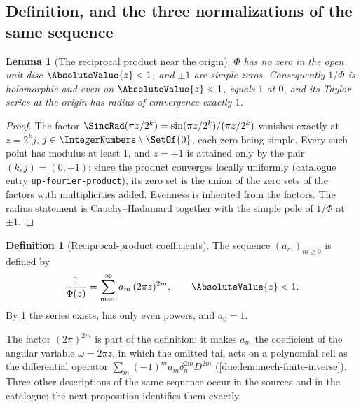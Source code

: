 \documentclass[11pt,oneside]{article}
\theoremstyle{plain}
\newtheorem{lemma}[theorem]{Lemma}
\theoremstyle{definition}
\newtheorem{definition}[theorem]{Definition}
\theoremstyle{remark}
\newcommand{\PhiUp}{\Phi}                                   %
\newcommand{\am}[1]{a_{#1}}                                 %
\begin{document}
\subsection{Definition, and the three normalizations of the same sequence}

\begin{lemma}[The reciprocal product near the origin]
\label{due:lem:mech-zero-free}
\(\PhiUp\) has no zero in the open unit disc \(\AbsoluteValue{z}<1\), and
\(\pm1\) are simple zeros.  Consequently \(1/\PhiUp\) is holomorphic and even
on \(\AbsoluteValue{z}<1\), equals \(1\) at \(0\), and its Taylor series at
the origin has radius of convergence exactly \(1\).
\end{lemma}

\begin{proof}
The factor \(\SincRad(\pi z/2^{k})=\sin(\pi z/2^{k})/(\pi z/2^{k})\) vanishes
exactly at \(z=2^{k}j\), \(j\in\IntegerNumbers\setminus\SetOf{0}\), each zero
being simple.  Every such point has modulus at least \(1\), and \(z=\pm1\) is
attained only by the pair \((k,j)=(0,\pm1)\); since the product converges
locally uniformly (catalogue entry \texttt{up-fourier-product}), its zero set
is the union of the zero sets of the factors with multiplicities added.
Evenness is inherited from the factors.  The radius statement is
Cauchy--Hadamard together with the simple pole of \(1/\PhiUp\) at \(\pm1\).
\end{proof}

\begin{definition}[Reciprocal-product coefficients]
\label{due:def:mech-am}
The sequence \((\am{m})_{m\ge0}\) is defined by
\begin{equation}
 \frac{1}{\PhiUp(z)}=\sum_{m=0}^{\infty}\am{m}\,(2\pi z)^{2m},
 \qquad\AbsoluteValue{z}<1 .
 \label{due:eq:mech-am-def}
\end{equation}
By \cref{due:lem:mech-zero-free} the series exists, has only even powers, and
\(\am{0}=1\).
\end{definition}

The factor \((2\pi)^{2m}\) is part of the definition: it makes \(\am{m}\) the
coefficient of the angular variable \(\omega=2\pi z\), in which the omitted
tail acts on a polynomial cell as the differential operator
\(\sum_m(-1)^m\am{m}\delta_n^{2m}D^{2m}\)
(\cref{due:lem:mech-finite-inverse}).  Three other descriptions of the same
sequence occur in the sources and in the catalogue; the next proposition
identifies them exactly.
\end{document}
